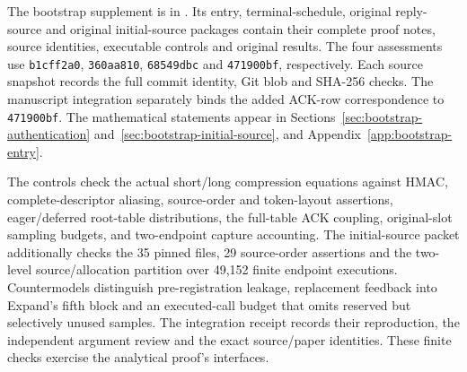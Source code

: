 The bootstrap supplement is in .
Its entry, terminal-schedule, original reply-source and original initial-source
packages contain their complete proof notes, source identities, executable controls and original
results. The four assessments use \texttt{b1cff2a0}, \texttt{360aa810},
\texttt{68549dbc} and \texttt{471900bf}, respectively. Each source
snapshot records the full commit identity, Git blob and SHA-256 checks.
The manuscript integration separately binds the added ACK-row correspondence
to \texttt{471900bf}. The mathematical statements appear in
Sections~\ref{sec:bootstrap-authentication}
and~\ref{sec:bootstrap-initial-source}, and
Appendix~\ref{app:bootstrap-entry}.

The controls check the actual short/long compression equations against HMAC,
complete-descriptor aliasing, source-order and token-layout assertions,
eager/deferred root-table distributions, the full-table ACK coupling,
original-slot sampling budgets, and two-endpoint capture accounting.
The initial-source packet additionally checks the 35 pinned files,
29 source-order assertions and the two-level source/allocation partition
over 49,152 finite endpoint executions.
Countermodels distinguish pre-registration leakage, replacement feedback
into Expand's fifth block and an executed-call budget that omits reserved
but selectively unused samples. The integration receipt records their
reproduction, the independent argument review and the exact source/paper
identities. These finite checks exercise the analytical proof's interfaces.
